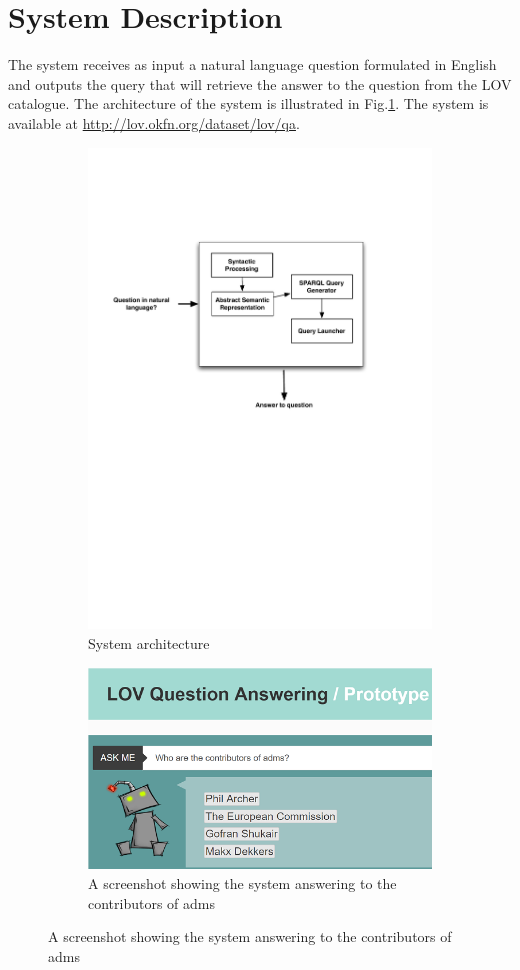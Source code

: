 \documentclass[runningheads,a4paper]{llncs}
\begin{document}


\section{System Description}
\label{sec:system}

The system receives as input a natural language question formulated in English and outputs the query that will retrieve the answer to the question from the LOV catalogue. The architecture of the system is illustrated in Fig.\ref{fig:q4lovarchi}. The system is available at \url{http://lov.okfn.org/dataset/lov/qa}.

\begin{figure}
\centering
\begin{subfigure}
  \centering
  \includegraphics[width=.3\linewidth]{img/qa4lov-archi.pdf}
  \caption{System architecture}
  \label{fig:q4lovarchi}
\end{subfigure}%
\begin{subfigure}
  \centering
  \includegraphics[width=.5\linewidth]{img/qa-screenshot.png}
  \caption{A screenshot showing the system answering to the contributors of adms}
  \label{fig:sub2}
\end{subfigure}
\label{fig:test}
\end{figure}
\end{document}
